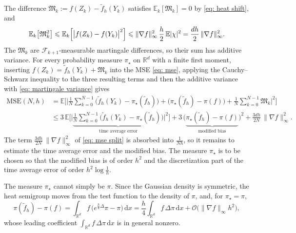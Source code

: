 \documentclass{article}
\newcommand{\Le}{\leqslant}
\newcommand{\D}{\mathrm{d}}
\newcommand{\MSE}{\mathrm{MSE}}
\newcommand{\norm}[1]{\lVert #1 \rVert}
\numberwithin{equation}{section}
\begin{document}
The difference $\mathfrak M_k := f(Z_k) - \tilde f_h(Y_k)$ satisfies $\mathbb E_k[\mathfrak M_k] = 0$ by \eqref{eq: heat shift}, and 
\begin{equation}
    \mathbb E_k\bigl[ \mathfrak M_k^2 \bigr] \Le \mathbb E_k\Bigl[ \bigl| f(Z_k) - f(Y_k) \bigr|^2 \Bigr] \Le \norm{\nabla f}_\infty^2\, \frac h2\, \mathbb E |\chi|^2 = \frac{d h}{2}\, \norm{\nabla f}_\infty^2 .
    \label{eq: martingale variance}
\end{equation}
The $\mathfrak M_k$ are $\mathcal F_{k+1}$-measurable martingale differences, so their sum has additive variance. For every probability measure $\pi_\star$ on $\mathbb R^d$ with a finite first moment, inserting $f(Z_k) = \tilde f_h(Y_k) + \mathfrak M_k$ into the MSE \eqref{eq: mse}, applying the Cauchy--Schwarz inequality to the three resulting terms and then the additive variance with \eqref{eq: martingale variance} gives
\begin{equation}
\begin{aligned}
    \MSE(N,h)
    &= \mathbb E \Biggl[ \biggl| \frac1N \sum_{k=0}^{N-1} \bigl( \tilde f_h(Y_k) - \pi_\star(\tilde f_h) \bigr) + \bigl( \pi_\star(\tilde f_h) - \pi(f) \bigr) + \frac1N \sum_{k=0}^{N-1} \mathfrak M_k \biggr|^2 \Biggr] \\
    &\Le 3\, \mathbb E \Biggl[ \biggl| \underbrace{\frac1N \sum_{k=0}^{N-1} \bigl( \tilde f_h(Y_k) - \pi_\star(\tilde f_h) \bigr)}_{\text{time average error}} \biggr|^2 \Biggr] + 3\, \bigl( \underbrace{\pi_\star(\tilde f_h) - \pi(f)}_{\text{modified bias}} \bigr)^2 + \frac{3 d h}{2 N}\, \norm{\nabla f}_\infty^2 .
\end{aligned}
    \label{eq: mse split}
\end{equation}
The term $\frac{3 d h}{2 N}\, \norm{\nabla f}_\infty^2$ of \eqref{eq: mse split} is absorbed into $\frac{1}{Nh}$, so it remains to estimate the time average error and the modified bias. The measure $\pi_\star$ is to be chosen so that the modified bias is of order $h^2$ and the discretization part of the time average error of order $h^2 \log\frac1h$.

The measure $\pi_\star$ cannot simply be $\pi$. Since the Gaussian density is symmetric, the heat semigroup moves from the test function to the density of $\pi$, and, for $\pi_\star = \pi$,
\begin{equation}
	\pi(\tilde f_h) - \pi(f) = \int_{\mathbb R^d} f\, \bigl( e^{\frac h4 \Delta} \pi - \pi \bigr)\, \D x = \frac h4 \int_{\mathbb R^d} f\, \Delta \pi\, \D x + \mathcal O\bigl(\norm{\nabla f}_\infty h^2\bigr) ,
	\label{eq: shift expansion}
\end{equation}
whose leading coefficient $\int_{\mathbb R^d} f\, \Delta \pi\, \D x$ is in general nonzero.
\end{document}

